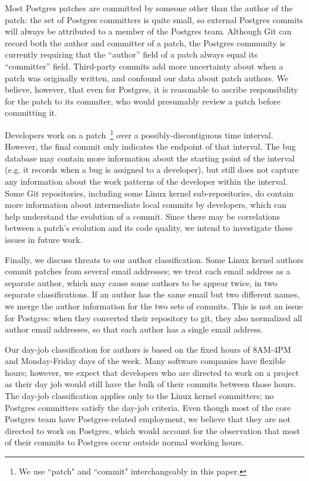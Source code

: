 Most Postgres patches are committed by someone other than the author
of the patch: the set of Postgres committers is quite small, so
external Postgres commits will always be attributed to a member of the
Postgres team. Although Git can record both the author and committer
of a patch, the Postgres community is currently requiring that the
``author'' field of a patch always equal its ``committer'' field.
Third-party commits add more uncertainty about when a patch was
originally written, and confound our data about patch authors.  We
believe, however, that even for Postgres, it is reasonable to ascribe
responsibility for the patch to its commiter, who would presumably
review a patch before committing it. 

Developers work on a patch~\footnote{We use ``patch" and ``commit" interchangeably in this paper.} over a possibly-discontiguous time
interval. However, the final commit only indicates the endpoint of
that interval.  The bug database may contain more information about
the starting point of the interval (e.g. it records when a bug is
assigned to a developer), but still does not capture any information
about the work patterns of the developer within the interval. Some Git
repositories, including some Linux kernel sub-repositories, do contain more
information about intermediate local commits by developers, which can
help understand the evolution of a commit. Since there may be
correlations between a patch's evolution and its code quality, we
intend to investigate these issues in future work.

Finally, we discuss threats to our author classification. Some Linux kernel 
authors commit patches from several email addresses; we treat each
email address as a separate author, which may cause some authors to be
appear twice, in two separate classifications. If an author has the
same email but two different names, we merge the author information
for the two sets of commits. This is not an issue for Postgres: when
they converted their repository to git, they also normalized all author
email addresses, so that each author has a single email address.

Our day-job classification for authors is based on the fixed hours of
8AM-4PM and Monday-Friday days of the week.  Many software companies
have flexible hours; however, we expect that developers who are
directed to work on a project as their day job would still have the
bulk of their commits between those hours.  The day-job classification
applies only to the Linux kernel committers; no Postgres committers satisfy
the day-job criteria. Even though most of the core Postgres team have
Postgres-related employment, we believe that they are not directed to
work on Postgres, which would account for the observation that most of
their commits to Postgres occur outside normal working hours.

